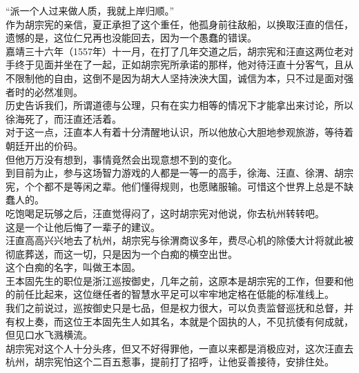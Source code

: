 \begin{multicols}{\theparacolNo}
“派一个人过来做人质，我就上岸归顺。”\\

作为胡宗宪的亲信，夏正承担了这个重任，他孤身前往敌船，以换取汪直的信任，遗憾的是，这位仁兄再也没能回去，因为一个愚蠢的错误。\\

嘉靖三十六年（1557年）十一月，在打了几年交道之后，胡宗宪和汪直这两位老对手终于见面并坐在了一起，正如胡宗宪所承诺的那样，他对待汪直十分客气，且从不限制他的自由，这倒不是因为胡大人坚持泱泱大国，诚信为本，只不过是面对强者时的必然准则。\\

历史告诉我们，所谓道德与公理，只有在实力相等的情况下才能拿出来讨论，所以徐海死了，而汪直还活着。\\

对于这一点，汪直本人有着十分清醒地认识，所以他放心大胆地参观旅游，等待着朝廷开出的价码。\\

但他万万没有想到，事情竟然会出现意想不到的变化。\\

到目前为止，参与这场智力游戏的人都是一等一的高手，徐海、汪直、徐渭、胡宗宪，个个都不是等闲之辈。他们懂得规则，也愿赌服输。可惜这个世界上总是不缺蠢人的。\\

吃饱喝足玩够之后，汪直觉得闷了，这时胡宗宪对他说，你去杭州转转吧。\\

这是一个让他后悔了一辈子的建议。\\

汪直高高兴兴地去了杭州，胡宗宪与徐渭商议多年，费尽心机的除倭大计将就此被彻底葬送，而这一切，只是因为一个白痴的横空出世。\\

这个白痴的名字，叫做王本固。\\

王本固先生的职位是浙江巡按御史，几年之前，这原本是胡宗宪的工作，但要和他的前任比起来，这位继任者的智慧水平足可以牢牢地定格在低能的标准线上。\\

我们之前说过，巡按御史只是七品，但是权力很大，可以负责监督巡抚和总督，并有权上奏，而这位王本固先生人如其名，本就是个固执的人，不见抗倭有何成就，但见口水飞溅横流。\\

胡宗宪对这个人十分头疼，但又不好得罪他，一直以来都是消极应对，这次汪直去杭州，胡宗宪怕这个二百五惹事，提前打了招呼，让他妥善接待，安排住处。\\


\end{multicols}
